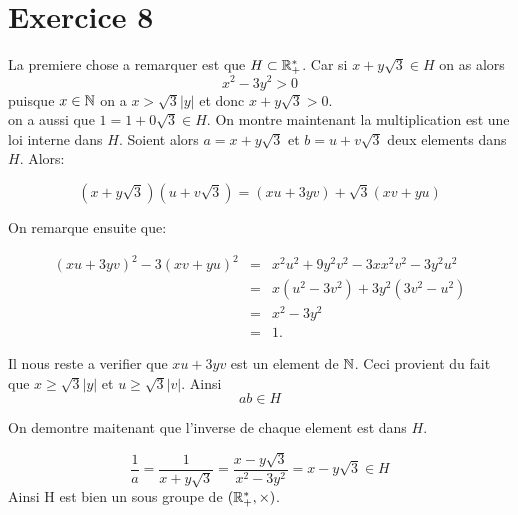 \documentclass{report}
\begin{document}
\section{Exercice 8}
\begin{myproof}
  La premiere chose a remarquer est que $H \subset \mathbb{R}_+^{*}$. Car si $x + y\sqrt{3} \in H$ on as alors 
  $$
  x^2 - 3 y^2 > 0 
  $$
  puisque $x\in \mathbb{N}$ on a $x > \sqrt{3}\vert y\vert$ et donc $x + y \sqrt{3} > 0$.\\

  on a aussi que $1 = 1 + 0\sqrt{3} \in H$. On montre maintenant la multiplication est une loi interne dans $H$. Soient alors $a = x + y\sqrt{3}$ et $b = u + v\sqrt{3}$ deux elements dans $H$. Alors:

  $$
  ( x + y\sqrt{3})(u + v\sqrt{3}) = (xu + 3yv) + \sqrt{3}( xv + yu)
  $$

  On remarque ensuite que:

  \begin{eqnarray*}
    (xu + 3yv)^2 - 3(xv + yu)^2 &=& x^2u^2 + 9y^2v^2 - 3xx^2v^2 - 3y^2u^2\\
                                &=& x\left(u^2 -3v^2\right) + 3y^2(3v^2 - u^2)\\
                                &=& x^2 - 3y^2\\
                                &=& 1.
  \end{eqnarray*}

  Il nous reste a verifier que $xu + 3yv$  est un element de $\mathbb{N}$. Ceci provient du fait que $x \geq \sqrt{3}\vert y \vert $ et $u \geq \sqrt{3}\vert v \vert$.
  Ainsi 
  $$
  ab \in H
  $$

  On demontre maitenant que l'inverse de chaque element est dans $H$.

$$
\dfrac{1}{a} = \dfrac{1}{x + y\sqrt{3}} = \dfrac{x - y\sqrt{3}}{x^2 - 3 y^2} = x - y\sqrt{3} \in H
$$
Ainsi H est bien un sous groupe de $(\mathbb{R}_+^{*}, \times)$.
\end{myproof}

\end{document}
